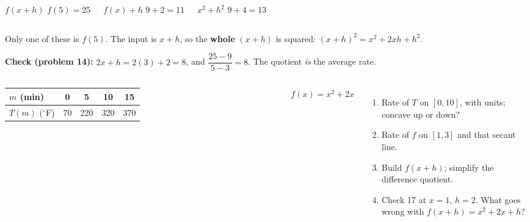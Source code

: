 \documentclass[aspectratio=169, 11pt]{beamer}
\begin{document}
\begin{frame}[t, plain]

  \begin{columns}[T]
      \begin{block}{\(f(x + h)\)}
        \(f(5) = 25\)
      \end{block}
      \begin{block}{\(f(x) + h\)}
        \(9 + 2 = 11\)
      \end{block}
      \begin{block}{\(x^2 + h^2\)}
        \(9 + 4 = 13\)
      \end{block}
  \end{columns}

  \bigskip
  Only one of these is \(f(5)\). The input is \(x + h\), so the \textbf{whole} \((x + h)\) is
  squared: \((x + h)^2 = x^2 + 2xh + h^2\).

  \bigskip
  \textbf{Check (problem 14):} \(2x + h = 2(3) + 2 = 8\), and
  \(\dfrac{25 - 9}{5 - 3} = 8\). The quotient \emph{is} the average rate.
\end{frame}

\begin{frame}[t, plain]

  \begin{columns}[T]
      \begin{tabular}{|l|c|c|c|c|}
      \hline
      \(m\) (min) & 0 & 5 & 10 & 15 \\ \hline
      \(T(m)\) (\(^\circ\)F) & 70 & 220 & 320 & 370 \\ \hline
      \end{tabular}

      \bigskip
      {\Large \(f(x) = x^2 + 2x\)}
      \begin{enumerate}\setlength{\itemsep}{6pt}
        \setcounter{enumi}{14}
        \item Rate of \(T\) on \([0, 10]\), with units; concave up or down?
        \item Rate of \(f\) on \([1, 3]\) and that secant line.
        \item Build \(f(x + h)\); simplify the difference quotient.
        \item Check 17 at \(x = 1\), \(h = 2\). What goes wrong with \(f(x + h) = x^2 + 2x + h\)?
      \end{enumerate}
  \end{columns}
\end{frame}
\end{document}
